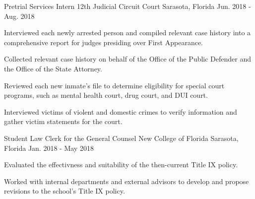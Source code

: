 

\begin{cventries}

  \cventry
    {Pretrial Services Intern} %
    {12th Judicial Circuit Court} %
    {Sarasota, Florida} %
    {Jun. 2018 - Aug. 2018} %
    {
      \begin{cvitems} %
        \item {Interviewed each newly arrested person and compiled relevant case history into a comprehensive report for judges presiding over First Appearance.}
        \item {Collected relevant case history on behalf of the Office of the Public Defender and the Office of the State Attorney.}
        \item {Reviewed each new inmate’s file to determine eligibility for special court programs, such as mental health court, drug court, and DUI court.}
        \item {Interviewed victims of violent and domestic crimes to verify information and gather victim statements for the court.}
      \end{cvitems}
    }

  \cventry
    {Student Law Clerk for the General Counsel} %
    {New College of Florida} %
    {Sarasota, Florida} %
    {Jan. 2018 - May 2018} %
    {
      \begin{cvitems} %
        \item {Evaluated the effectivness and suitability of the then-current Title IX policy.}
        \item {Worked with internal departments and external advisors to develop and propose revisions to the school’s Title IX policy.}
      \end{cvitems}
    }


\end{cventries}
